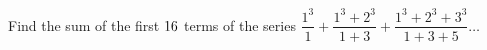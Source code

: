 
%
%
%
%      
% 
% 
%   



\question[4] Find the sum of the first $16$ terms of the series $\dfrac{1^3}{1} + \dfrac{1^3+2^3}{1+3} + \dfrac{1^3+2^3+3^3}{1+3+5}\ldots$


\watchout

\ifprintanswers
\fi 

